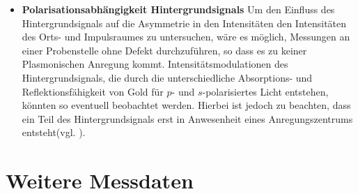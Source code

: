 \documentclass[titlepage,  ngerman]{article}
\begin{document}
\begin{itemize}
		\item \textbf{Polarisationsabhängigkeit Hintergrundsignals} Um den Einfluss des Hintergrundsignals auf die Asymmetrie in den Intensitäten den Intensitäten des Orts- und Impulsraumes zu untersuchen, wäre es möglich, Messungen an einer Probenstelle ohne Defekt durchzuführen, so dass es zu keiner Plasmonischen Anregung kommt. Intensitätsmodulationen des Hintergrundsignals, die durch die unterschiedliche Absorptions- und Reflektionsfähigkeit von Gold für $p$- und $s$-polarisiertes Licht entstehen, könnten so eventuell beobachtet werden. Hierbei ist jedoch zu beachten, dass ein Teil des Hintergrundsignals erst in Anwesenheit eines Anregungszentrums entsteht(vgl. \cite{Drezet.2008}).
	\end{itemize}	
	\newpage
	\appendix
	
	\newpage
	\section{Weitere Messdaten}
\end{document}
